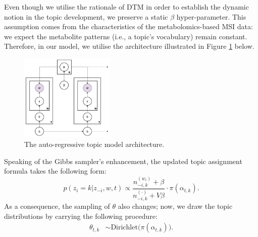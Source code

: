 \documentclass{mpaper}
\begin{document}
\par Even though we utilise the rationale of DTM in order to establish the dynamic notion in the topic development, we preserve a static $\beta$ hyper-parameter. This assumption comes from the characteristics of the metabolomics-based MSI data: we expect the metabolite patterns (i.e., a topic's vocabulary) remain constant. Therefore, in our model, we utilise the architecture illustrated in Figure \ref{fig:arch_ar} below.
\begin{figure}[H]
  \centering
  \includegraphics[width=0.4\textwidth]{ar-architecture.png}
  \caption{The auto-regressive topic model architecture.}
  \label{fig:arch_ar}
\end{figure}

\par Speaking of the Gibbs sampler's enhancement, the updated topic assignment formula takes the following form:
\begin{equation*}
p(z_i = k | z_{-i}, w, t) \propto \dfrac{n_{-i, k}^{(w_i)} + \beta}{n_{-i, k}^{(\cdot)} + V\beta}\cdot \pi(\alpha_{t,k}).
\end{equation*}
As a consequence, the sampling of $\theta$ also changes; now, we draw the topic distributions by carrying the following procedure:
\begin{align*}
\theta_{t,k} & \sim \mbox{Dirichlet}\big(\pi(\alpha_{t,k})\big).
\end{align*}
\end{document}

